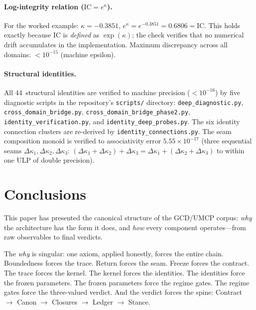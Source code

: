 \documentclass[
  aps,
  prd,
  twocolumn,
  superscriptaddress,
  nofootinbib,
  floatfix
]{revtex4-2}
\newcommand{\IC}{\mathrm{IC}}
\begin{document}
\paragraph{Log-integrity relation ($\IC = e^\kappa$).}
For the worked example: $\kappa = -0.3851$,
$e^\kappa = e^{-0.3851} = 0.6806 = \IC$.  This holds exactly
because $\IC$ is \emph{defined} as $\exp(\kappa)$; the check
verifies that no numerical drift accumulates in the
implementation.  Maximum discrepancy across all domains:
$< 10^{-15}$ (machine epsilon).

\paragraph{Structural identities.}
All 44~structural identities are verified to machine precision
($< 10^{-16}$) by five diagnostic scripts in the repository's
\texttt{scripts/} directory:
\texttt{deep\_diagnostic.py},
\texttt{cross\_domain\_bridge.py},
\texttt{cross\_domain\_bridge\_phase2.py},
\texttt{identity\_verification.py}, and
\texttt{identity\_deep\_probes.py}.
The six identity connection clusters are re-derived by
\texttt{identity\_connections.py}.
The seam composition monoid
is verified to associativity error $5.55 \times 10^{-17}$
(three sequential seams
$\Delta\kappa_1, \Delta\kappa_2, \Delta\kappa_3$:
$(\Delta\kappa_1 {+} \Delta\kappa_2) + \Delta\kappa_3 =
\Delta\kappa_1 + (\Delta\kappa_2 {+} \Delta\kappa_3)$
to within one ULP of double precision).


\section{Conclusions}
\label{sec:conclusions}

This paper has presented the canonical structure of the GCD/UMCP
corpus: \emph{why} the architecture has the form it does, and
\emph{how} every component operates---from raw observables to
final verdicts.

The \emph{why} is singular: one axiom, applied honestly, forces
the entire chain.  Boundedness forces the trace.  Return forces
the seam.  Freeze forces the contract.  The trace forces the
kernel.  The kernel forces the identities.  The identities force
the frozen parameters.  The frozen parameters force the regime
gates.  The regime gates force the three-valued verdict.  And
the verdict forces the spine:
Contract $\to$ Canon $\to$ Closures $\to$ Ledger $\to$ Stance.
\end{document}
